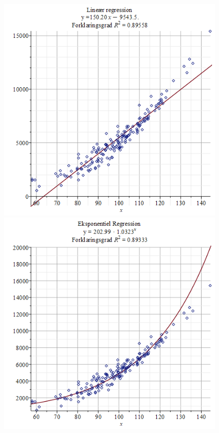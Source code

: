 \begin{exa}
\begin{figure}[H]
\centering
\includegraphics[width = \textwidth*4/10]{Billeder/LinRegtilRes.png}
\includegraphics[width = \textwidth*4/10]{Billeder/ExpRegtilRes.png}

\end{figure}
\end{exa}

